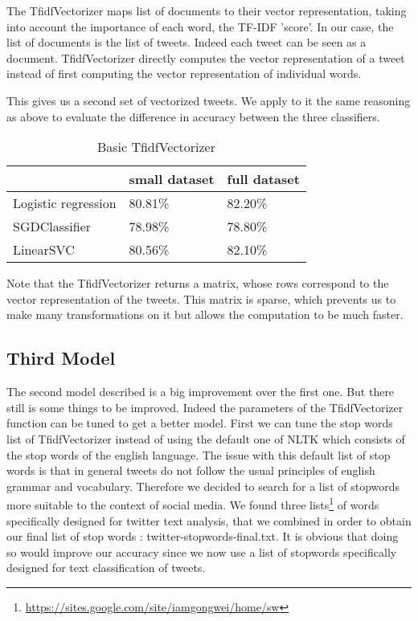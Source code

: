 \documentclass[10pt,conference,compsocconf]{IEEEtran}
\begin{document}
The TfidfVectorizer maps list of documents to their vector representation, taking into account the importance of each word, the TF-IDF 'score'. In our case, the list of documents is the list of tweets. Indeed each tweet can be seen as a document. TfidfVectorizer directly computes the vector representation of a tweet instead of first computing the vector representation of individual words.

This gives us a second set of vectorized tweets. We apply to it the same reasoning as above to evaluate the difference in accuracy between the three classifiers. 

\begin{table}[H]
\center
\caption{Basic TfidfVectorizer}
\begin{tabular}{@{}lll@{}}
    \toprule
    & small dataset & full dataset \\
    \hline
    Logistic regression & 80.81\% & 82.20\% \\
    SGDClassifier & 78.98\% & 78.80\% \\
    LinearSVC & 80.56\% & 82.10\% \\
    \bottomrule
\end{tabular}
\end{table}

Note that the TfidfVectorizer returns a matrix, whose rows correspond to the vector representation of the tweets. This matrix is sparse, which prevents us to make many transformations on it but allows the computation to be much faster.

\subsection{Third Model}

The second model described is a big improvement over the first one. But there still is some things to be improved. Indeed the parameters  of the TfidfVectorizer function can be tuned to get a better model. First we can tune the stop words list of TfidfVectorizer instead of using the default one of NLTK which consists of the stop words of the english language. The issue with this default list of stop words is that in general tweets do not follow the usual principles of english grammar and vocabulary. Therefore we decided to search for a list of stopwords more suitable to the context of social media. We found three lists\footnote{\url{https://sites.google.com/site/iamgongwei/home/sw}} of words specifically designed for twitter text analysis, that we combined in order to obtain our final list of stop words : twitter-stopwords-final.txt. It is obvious that doing so would improve our accuracy since we now use a list of stopwords specifically designed for text classification of tweets.
\end{document}
